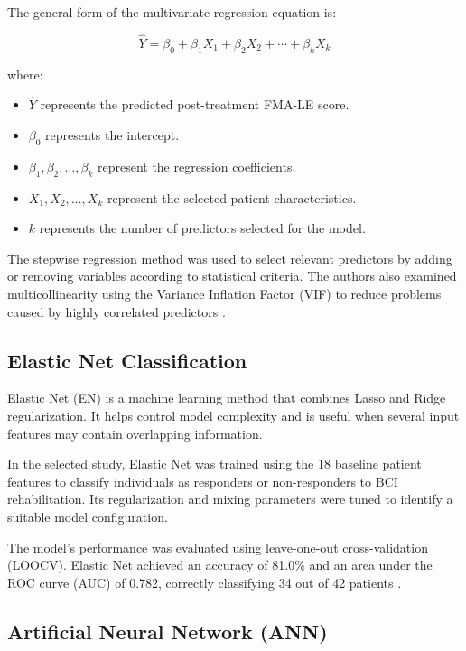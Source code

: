 The general form of the multivariate regression equation is:

\begin{equation}
\hat{Y} = \beta_0 + \beta_1 X_1 + \beta_2 X_2
+ \cdots + \beta_k X_k
\end{equation}

where:

\begin{itemize}
    \item $\hat{Y}$ represents the predicted post-treatment FMA-LE score.
    \item $\beta_0$ represents the intercept.
    \item $\beta_1,\beta_2,\ldots,\beta_k$ represent the regression coefficients.
    \item $X_1,X_2,\ldots,X_k$ represent the selected patient characteristics.
    \item $k$ represents the number of predictors selected for the model.
\end{itemize}

The stepwise regression method was used to select relevant predictors by adding or removing variables according to statistical criteria. The authors also examined multicollinearity using the Variance Inflation Factor (VIF) to reduce problems caused by highly correlated predictors \cite{bib1}.

\subsection{{Elastic Net Classification}}

Elastic Net (EN) is a machine learning method that combines Lasso and Ridge regularization. It helps control model complexity and is useful when several input features may contain overlapping information.

In the selected study, Elastic Net was trained using the 18 baseline patient features to classify individuals as responders or non-responders to BCI rehabilitation. Its regularization and mixing parameters were tuned to identify a suitable model configuration.

The model's performance was evaluated using leave-one-out cross-validation (LOOCV). Elastic Net achieved an accuracy of 81.0\% and an area under the ROC curve (AUC) of 0.782, correctly classifying 34 out of 42 patients \cite{bib1}.

\subsection{{Artificial Neural Network (ANN)}}

